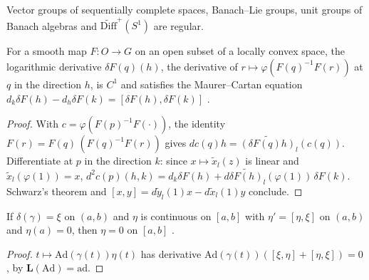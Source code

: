 \begin{corollary}
  \label{cor:regular-examples}
  \leanok
  Vector groups of sequentially complete spaces, Banach--Lie groups, unit groups of Banach
  algebras and $\widetilde{\mathrm{Diff}}^+(S^1)$ are regular.
\end{corollary}

\begin{lemma}
  \label{lem:maurer-cartan}
  \leanok
  For a smooth map $F\colon O \to G$ on an open subset of a locally convex space, the logarithmic
  derivative $\delta F(q)(h)$, the derivative of $r \mapsto \varphi(F(q)^{-1}F(r))$ at $q$ in the
  direction $h$, is $C^1$ and satisfies the Maurer--Cartan equation
  $d_k \delta F(h) - d_h \delta F(k) = [\delta F(h), \delta F(k)]$ \cite[Lemma 5.5.5]{GN26}.
\end{lemma}

\begin{proof}
  \leanok
  With $c = \varphi(F(p)^{-1}F(\cdot))$, the identity $F(r) = F(q)\,(F(q)^{-1}F(r))$ gives
  $dc(q)h = \widetilde{(\delta F(q)h)}_l(c(q))$. Differentiate at $p$ in the direction $k$: since
  $x \mapsto \tilde x_l(z)$ is linear and $\tilde x_l(\varphi(1)) = x$,
  $d^2c(p)(h, k) = d_k\delta F(h) + d\widetilde{\delta F(h)}_l(\varphi(1))\,\delta F(k)$. Schwarz's
  theorem and $[x, y] = d\tilde y_l(1)x - d\tilde x_l(1)y$ conclude.
\end{proof}

\begin{lemma}
  \label{lem:bracket-ode-unique}
  \leanok
  If $\delta(\gamma) = \xi$ on $(a, b)$ and $\eta$ is continuous on $[a, b]$ with
  $\eta' = [\eta, \xi]$ on $(a, b)$ and $\eta(a) = 0$, then $\eta = 0$ on $[a, b]$
  \cite[Lemma 6.1.7]{GN26}.
\end{lemma}

\begin{proof}
  \leanok
  $t \mapsto \mathrm{Ad}(\gamma(t))\eta(t)$ has derivative
  $\mathrm{Ad}(\gamma(t))([\xi, \eta] + [\eta, \xi]) = 0$, by $\mathbf{L}(\mathrm{Ad}) = \mathrm{ad}$.
\end{proof}

